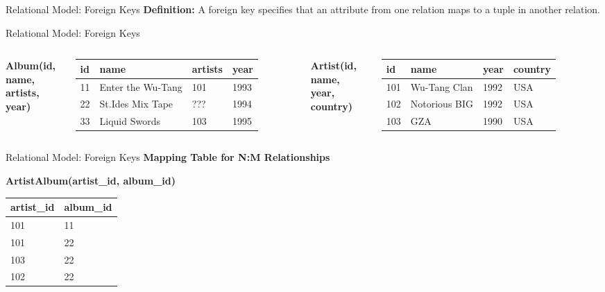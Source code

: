 \documentclass[aspectratio=169, 10pt]{beamer}
\begin{document}
\begin{frame}{Relational Model: Foreign Keys}
    \textbf{Definition:} A foreign key specifies that an attribute from one relation maps to a tuple in another relation.
\end{frame}

\begin{frame}{Relational Model: Foreign Keys}
    \begin{columns}
        \textbf{Album(id, name, artists, year)}
        \begin{table}
        \tiny
        \begin{tabular}{llll}
        \toprule
        id & name & artists & year \\
        \midrule
        11 & Enter the Wu-Tang & 101 & 1993 \\
        22 & St.Ides Mix Tape & ??? & 1994 \\
        33 & Liquid Swords & 103 & 1995 \\
        \bottomrule
        \end{tabular}
        \end{table}
        
        \textbf{Artist(id, name, year, country)}
        \begin{table}
        \tiny
        \begin{tabular}{llll}
        \toprule
        id & name & year & country \\
        \midrule
        101 & Wu-Tang Clan & 1992 & USA \\
        102 & Notorious BIG & 1992 & USA \\
        103 & GZA & 1990 & USA \\
        \bottomrule
        \end{tabular}
        \end{table}
    \end{columns}
\end{frame}

\begin{frame}{Relational Model: Foreign Keys}
    \textbf{Mapping Table for N:M Relationships}
    \begin{center}
        \textbf{ArtistAlbum(artist\_id, album\_id)}
        \begin{table}
        \begin{tabular}{ll}
        \toprule
        artist\_id & album\_id \\
        \midrule
        101 & 11 \\
        101 & 22 \\
        103 & 22 \\
        102 & 22 \\
        \bottomrule
        \end{tabular}
        \end{table}
    \end{center}
\end{frame}
\end{document}
